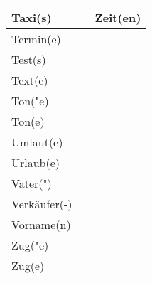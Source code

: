 \documentclass{article}
\begin{document}
\begin{table}[h!]
\begin{tabular}{|>{\raggedright\arraybackslash}p{5cm}|>{\raggedright\arraybackslash}p{5cm}|>{\raggedright\arraybackslash}p{5cm}|}
        Taxi(s) &  & Zeit(en) \\\hline
        Termin(e) &  &  \\\hline
        Test(s) &  &  \\\hline
        Text(e) &  &  \\\hline
        Ton("e) &  &  \\\hline
        Ton(e) &  &  \\\hline
        Umlaut(e) &  &  \\\hline
        Urlaub(e) &  &  \\\hline
        Vater(") &  &  \\\hline
        Verkäufer(-) &  &  \\\hline
        Vorname(n) &  &  \\\hline
        Zug("e) &  &  \\\hline
        Zug(e) &  &  \\\hline
    \end{tabular}
\end{table}
\end{document}
